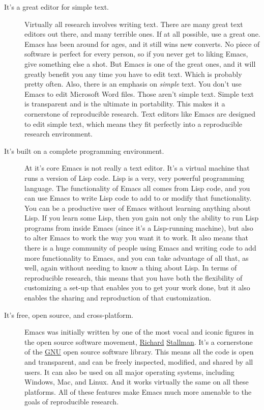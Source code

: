 \documentclass{article}
\begin{document}
\begin{description}
\item[It's a great editor for simple text.] Virtually all research involves writing text. There are many great text editors out there, and many terrible ones. If at all possible, use a great one. Emacs has been around for ages, and it still wins new converts. No piece of software is perfect for every person, so if you never get to liking Emacs, give something else a shot. But Emacs is one of the great ones, and it will greatly benefit you any time you have to edit text.  Which is probably pretty often. Also, there is an emphasis on \emph{simple} text. You don't use Emacs to edit Microsoft Word files.  Those aren't simple text. Simple text is transparent and is the ultimate in portability. This makes it a cornerstone of reproducible research. Text editors like Emacs are designed to edit simple text, which means they fit perfectly into a reproducible research environment.
\item[It's built on a complete programming environment.] At it's core Emacs is not really a text editor.  It's a virtual machine that runs a version of Lisp code.  Lisp is a very, very powerful programming language. The functionality of Emacs all comes from Lisp code, and you can use Emacs to write Lisp code to add to or modify that functionality. You can be a productive user of Emacs without learning anything about Lisp. If you learn some Lisp, then you gain not only the ability to run Lisp programs from inside Emacs (since it's a Lisp-running machine), but also to alter Emacs to work the way you want it to work.  It also means that there is a huge community of people using Emacs and writing code to add more functionality to Emacs, and you can take advantage of all that, as well, again without needing to know a thing about Lisp. In terms of reproducible research, this means that you have both the flexibility of customizing a set-up that enables you to get your work done, but it also enables the sharing and reproduction of that customization.
\item[It's free, open source, and cross-platform.] Emacs was initially written by one of the most vocal and iconic figures in the open source software movement, \href{http://en.wikipedia.org/wiki/Richard_Stallman}{Richard} \href{http://xkcd.com/344/}{Stallman}.  It's a cornerstone of the \href{http://www.gnu.org/}{GNU} open source software library.  This means all the code is open and transparent, and can be freely inspected, modified, and shared by all users. It can also be used on all major operating systems, including Windows, Mac, and Linux. And it works virtually the same on all these platforms. All of these features make Emacs much more amenable to the goals of reproducible research.

\end{description}
\end{document}

